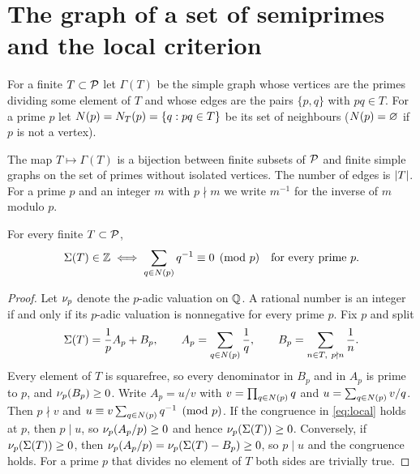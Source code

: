 \documentclass[11pt]{article}
\begin{document}
\section{The graph of a set of semiprimes and the local criterion}\label{sec:graph}

\begin{definition}
For a finite $T\subset\mathcal{P}$ let $\Gamma(T)$ be the simple graph whose vertices are the primes dividing some element of $T$ and whose edges are the pairs $\{p,q\}$ with $pq\in T$. For a prime $p$ let $N(p)=N_T(p)=\{q: pq\in T\}$ be its set of neighbours ($N(p)=\varnothing$ if $p$ is not a vertex).
\end{definition}

The map $T\mapsto\Gamma(T)$ is a bijection between finite subsets of $\mathcal{P}$ and finite simple graphs on the set of primes without isolated vertices. The number of edges is $\lvert T\rvert$. For a prime $p$ and an integer $m$ with $p\nmid m$ we write $m^{-1}$ for the inverse of $m$ modulo $p$.

\begin{lemma}\label{lem:local}
For every finite $T\subset\mathcal{P}$,
\begin{equation}\label{eq:local}
\Sigma(T)\in\mathbb{Z}\iff \sum_{q\in N(p)}q^{-1}\equiv 0\pmod p\quad\text{for every prime }p .
\end{equation}
\end{lemma}

\begin{proof}
Let $\nu_p$ denote the $p$-adic valuation on $\mathbb{Q}$. A rational number is an integer if and only if its $p$-adic valuation is nonnegative for every prime $p$.
Fix $p$ and split
\[
\Sigma(T)=\frac1p A_p+B_p,\qquad A_p=\sum_{q\in N(p)}\frac1q,\qquad B_p=\sum_{n\in T,\ p\nmid n}\frac1n .
\]
Every element of $T$ is squarefree, so every denominator in $B_p$ and in $A_p$ is prime to $p$, and $\nu_p(B_p)\ge 0$.
Write $A_p=u/v$ with $v=\prod_{q\in N(p)}q$ and $u=\sum_{q\in N(p)}v/q$. Then $p\nmid v$ and $u\equiv v\sum_{q\in N(p)}q^{-1}\pmod p$.
If the congruence in \eqref{eq:local} holds at $p$, then $p\mid u$, so $\nu_p(A_p/p)\ge 0$ and hence $\nu_p(\Sigma(T))\ge 0$.
Conversely, if $\nu_p(\Sigma(T))\ge0$, then $\nu_p(A_p/p)=\nu_p(\Sigma(T)-B_p)\ge 0$, so $p\mid u$ and the congruence holds.
For a prime $p$ that divides no element of $T$ both sides are trivially true.
\end{proof}
\end{document}

